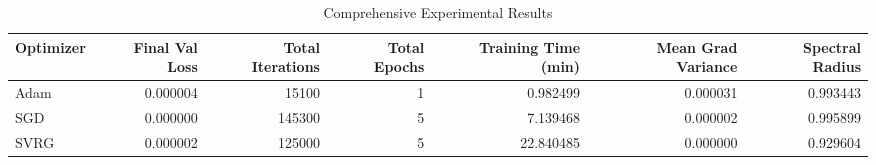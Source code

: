 \begin{table}
\caption{Comprehensive Experimental Results}
\label{tab:comprehensive_results}
\begin{tabular}{lrrrrrr}
\toprule
Optimizer & Final Val Loss & Total Iterations & Total Epochs & Training Time (min) & Mean Grad Variance & Spectral Radius \\
\midrule
Adam & 0.000004 & 15100 & 1 & 0.982499 & 0.000031 & 0.993443 \\
SGD & 0.000000 & 145300 & 5 & 7.139468 & 0.000002 & 0.995899 \\
SVRG & 0.000002 & 125000 & 5 & 22.840485 & 0.000000 & 0.929604 \\
\bottomrule
\end{tabular}
\end{table}
